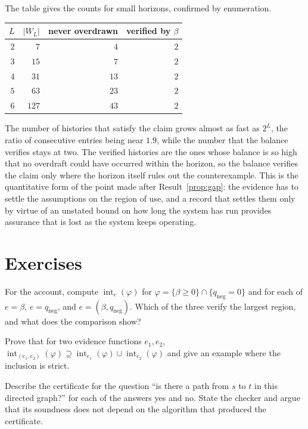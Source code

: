 The table gives the counts for small horizons, confirmed by enumeration.
\begin{center}
\begin{tabular}{rrrr}
\toprule
$L$ & $|W_L|$ & never overdrawn & verified by $\beta$\\
\midrule
$2$ & $7$ & $4$ & $2$\\
$3$ & $15$ & $7$ & $2$\\
$4$ & $31$ & $13$ & $2$\\
$5$ & $63$ & $23$ & $2$\\
$6$ & $127$ & $43$ & $2$\\
\bottomrule
\end{tabular}
\end{center}
The number of histories that satisfy the claim grows almost as fast as $2^{L}$, the ratio of consecutive entries being near $1.9$, while the number that the balance verifies stays at two. The verified histories are the ones whose balance is so high that no overdraft could have occurred within the horizon, so the balance verifies the claim only where the horizon itself rules out the counterexample. This is the quantitative form of the point made after Result~\ref{prop:gap}: the evidence has to settle the assumptions on the region of use, and a record that settles them only by virtue of an unstated bound on how long the system has run provides assurance that is lost as the system keeps operating.

\section*{Exercises}

\begin{exercise}
For the account, compute $\operatorname{int}_e(\varphi)$ for $\varphi=\{\beta\ge0\}\cap\{q_{\mathrm{neg}}=0\}$ and for each of $e=\beta$, $e=q_{\mathrm{neg}}$, and $e=(\beta,q_{\mathrm{neg}})$. Which of the three verify the largest region, and what does the comparison show?
\end{exercise}

\begin{exercise}
Prove that for two evidence functions $e_1,e_2$, $\operatorname{int}_{(e_1,e_2)}(\varphi)\supseteq\operatorname{int}_{e_1}(\varphi)\cup\operatorname{int}_{e_2}(\varphi)$ and give an example where the inclusion is strict.
\end{exercise}

\begin{exercise}
Describe the certificate for the question ``is there a path from $s$ to $t$ in this directed graph?'' for each of the answers yes and no. State the checker and argue that its soundness does not depend on the algorithm that produced the certificate.
\end{exercise}

